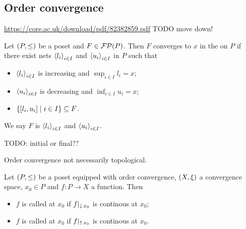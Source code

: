 \subsection{Order convergence}
\url{https://core.ac.uk/download/pdf/82382859.pdf}
TODO move down!

\begin{definition}
Let $\left( P,\leq \right)$ be a poset and $F\in\operatorname{\mathcal{FP}}(P)$. Then $F$ converges to $x$ in the  on $P$ if there exist nets $\left\langle l_i \right\rangle_{i\in I}$ and $\left\langle u_i \right\rangle_{i\in I}$ in $P$ such that
\begin{itemize}
    \item $\left\langle l_i \right\rangle_{i\in I}$ is increasing and $\sup_{i\in I} l_i = x$;
    \item $\left\langle u_i \right\rangle_{i\in I}$ is decreasing and $\inf_{i\in I} u_i = x$;
    \item $\setbuilder{[l_i, u_i]}{i\in I} \subseteq F$.
\end{itemize}
We say $F$ is  $\left\langle l_i \right\rangle_{i\in I}$ and $\left\langle u_i \right\rangle_{i\in I}$.
\end{definition}

TODO: initial or final??

\begin{example}
Order convergence not necessarily topological.
\end{example}


\begin{definition}
Let $\left( P,\leq \right)$ be a poset equipped with order convergence, $\left( X,\xi \right)$ a convergence space, $x_0\in P$ and $f: P\to X$ a function. Then
\begin{itemize}
\item $f$ is called  at $x_0$ if $f|_{\operatorname{\downarrow} x_0}$ is continous at $x_0$;
\item $f$ is called  at $x_0$ if $f|_{\operatorname{\uparrow} x_0}$ is continous at $x_0$.
\end{itemize}
\end{definition}

